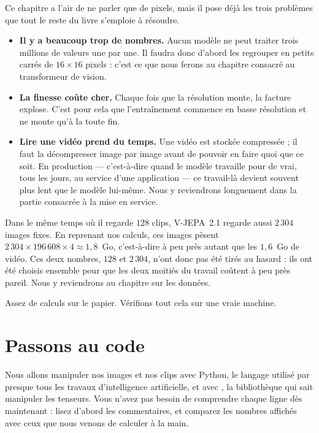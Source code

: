 \begin{enia}
Ce chapitre a l'air de ne parler que de pixels, mais il pose déjà les trois
problèmes que tout le reste du livre s'emploie à résoudre.

\begin{itemize}
  \item \textbf{Il y a beaucoup trop de nombres.} Aucun modèle ne peut
        traiter trois millions de valeurs une par une. Il faudra donc
        d'abord les regrouper en petits carrés de $16 \times 16$ pixels :
        c'est ce que nous ferons au chapitre consacré au transformeur de
        vision.
  \item \textbf{La finesse coûte cher.} Chaque fois que la résolution
        monte, la facture explose. C'est pour cela que l'entraînement
        commence en basse résolution et ne monte qu'à la toute fin.
  \item \textbf{Lire une vidéo prend du temps.} Une vidéo est stockée
        compressée ; il faut la décompresser image par image avant de
        pouvoir en faire quoi que ce soit. En production — c'est-à-dire
        quand le modèle travaille pour de vrai, tous les jours, au service
        d'une application — ce travail-là devient souvent plus lent que le
        modèle lui-même. Nous y
        reviendrons longuement dans la partie consacrée à la mise en
        service.
\end{itemize}
\end{enia}

\begin{plusloin}
Dans le même temps où il regarde $128$ clips, V-JEPA~2.1 regarde aussi
$2\,304$ images fixes. En reprenant nos calculs, ces images pèsent
$2\,304 \times 196\,608 \times 4 \approx 1,8$~Go, c'est-à-dire à peu près
autant que les $1,6$~Go de vidéo. Ces deux nombres, $128$ et $2\,304$,
n'ont donc pas été tirés au hasard : ils ont été choisis ensemble pour que
les deux moitiés du travail coûtent à peu près pareil. Nous y reviendrons
au chapitre sur les données.
\end{plusloin}

Assez de calculs sur le papier. Vérifions tout cela sur une vraie machine.

\section{Passons au code}

Nous allons manipuler nos images et nos clips avec Python, le langage
utilisé par presque tous les travaux d'intelligence artificielle, et avec
, la bibliothèque qui sait manipuler les tenseurs. Vous
n'avez pas besoin de comprendre chaque ligne dès maintenant : lisez d'abord
les commentaires, et comparez les nombres affichés avec ceux que nous
venons de calculer à la main.

